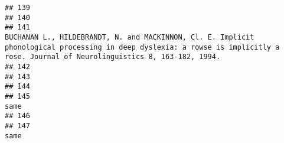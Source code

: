 \documentclass[
  english,
  man]{apa6}
\begin{document}
\begin{verbatim}
## 139                                                                                                                                                                                                                                                                                                                    
## 140                                                                                                                                                                                                                                                                                                                    
## 141                                                                                                                                   BUCHANAN L., HILDEBRANDT, N. and MACKINNON, Cl. E. Implicit phonological processing in deep dyslexia: a rowse is implicitly a rose. Journal of Neurolinguistics 8, 163-182, 1994.
## 142                                                                                                                                                                                                                                                                                                                    
## 143                                                                                                                                                                                                                                                                                                                    
## 144                                                                                                                                                                                                                                                                                                                    
## 145                                                                                                                                                                                                                                                                                                                same
## 146                                                                                                                                                                                                                                                                                                                    
## 147                                                                                                                                                                                                                                                                                                                same

\end{verbatim}
\end{document}
